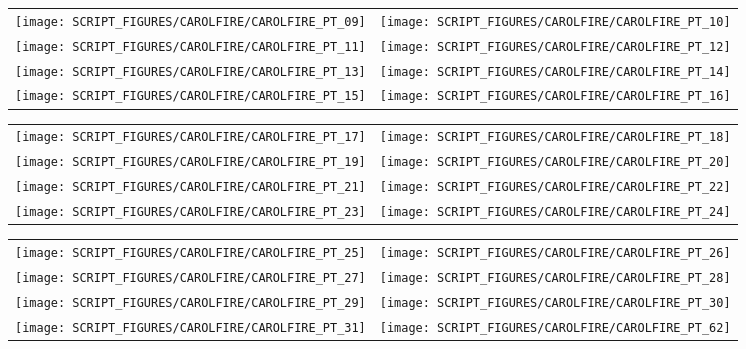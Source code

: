 \begin{figure}[!ht]
\begin{tabular*}{\textwidth}{l@{\extracolsep{\fill}}r}
\texttt{[image: SCRIPT\_FIGURES/CAROLFIRE/CAROLFIRE\_PT\_09]} &
\texttt{[image: SCRIPT\_FIGURES/CAROLFIRE/CAROLFIRE\_PT\_10]} \\
\texttt{[image: SCRIPT\_FIGURES/CAROLFIRE/CAROLFIRE\_PT\_11]} &
\texttt{[image: SCRIPT\_FIGURES/CAROLFIRE/CAROLFIRE\_PT\_12]} \\
\texttt{[image: SCRIPT\_FIGURES/CAROLFIRE/CAROLFIRE\_PT\_13]} &
\texttt{[image: SCRIPT\_FIGURES/CAROLFIRE/CAROLFIRE\_PT\_14]} \\
\texttt{[image: SCRIPT\_FIGURES/CAROLFIRE/CAROLFIRE\_PT\_15]} &
\texttt{[image: SCRIPT\_FIGURES/CAROLFIRE/CAROLFIRE\_PT\_16]}
\end{tabular*}
\end{figure}

\begin{figure}[!ht]
\begin{tabular*}{\textwidth}{l@{\extracolsep{\fill}}r}
\texttt{[image: SCRIPT\_FIGURES/CAROLFIRE/CAROLFIRE\_PT\_17]} &
\texttt{[image: SCRIPT\_FIGURES/CAROLFIRE/CAROLFIRE\_PT\_18]} \\
\texttt{[image: SCRIPT\_FIGURES/CAROLFIRE/CAROLFIRE\_PT\_19]} &
\texttt{[image: SCRIPT\_FIGURES/CAROLFIRE/CAROLFIRE\_PT\_20]} \\
\texttt{[image: SCRIPT\_FIGURES/CAROLFIRE/CAROLFIRE\_PT\_21]} &
\texttt{[image: SCRIPT\_FIGURES/CAROLFIRE/CAROLFIRE\_PT\_22]} \\
\texttt{[image: SCRIPT\_FIGURES/CAROLFIRE/CAROLFIRE\_PT\_23]} &
\texttt{[image: SCRIPT\_FIGURES/CAROLFIRE/CAROLFIRE\_PT\_24]}
\end{tabular*}
\end{figure}

\begin{figure}[!ht]
\begin{tabular*}{\textwidth}{l@{\extracolsep{\fill}}r}
\texttt{[image: SCRIPT\_FIGURES/CAROLFIRE/CAROLFIRE\_PT\_25]} &
\texttt{[image: SCRIPT\_FIGURES/CAROLFIRE/CAROLFIRE\_PT\_26]} \\
\texttt{[image: SCRIPT\_FIGURES/CAROLFIRE/CAROLFIRE\_PT\_27]} &
\texttt{[image: SCRIPT\_FIGURES/CAROLFIRE/CAROLFIRE\_PT\_28]} \\
\texttt{[image: SCRIPT\_FIGURES/CAROLFIRE/CAROLFIRE\_PT\_29]} &
\texttt{[image: SCRIPT\_FIGURES/CAROLFIRE/CAROLFIRE\_PT\_30]} \\
\texttt{[image: SCRIPT\_FIGURES/CAROLFIRE/CAROLFIRE\_PT\_31]} &
\texttt{[image: SCRIPT\_FIGURES/CAROLFIRE/CAROLFIRE\_PT\_62]}
\end{tabular*}
\end{figure}

